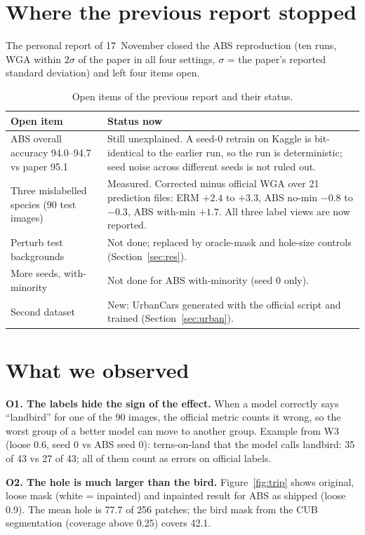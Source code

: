 \documentclass[runningheads]{llncs}
\begin{document}
\section{Where the previous report stopped}

The personal report of 17~November closed the ABS reproduction (ten runs, WGA within $2\sigma$ of the paper in all four settings, $\sigma$ = the paper's reported standard deviation) and left four items open.

\begin{table}[H]
\centering
\caption{Open items of the previous report and their status.}
\label{tab:open}
\small
\begin{tabular}{@{}p{3.6cm}p{8.4cm}@{}}
\toprule
Open item & Status now\\
\midrule
ABS overall accuracy 94.0--94.7 vs paper 95.1 & Still unexplained. A seed-0 retrain on Kaggle is bit-identical to the earlier run, so the run is deterministic; seed noise across different seeds is not ruled out.\\
Three mislabelled species (90 test images) & Measured. Corrected minus official WGA over 21 prediction files: ERM $+2.4$ to $+3.3$, ABS no-min $-0.8$ to $-0.3$, ABS with-min $+1.7$. All three label views are now reported.\\
Perturb test backgrounds & Not done; replaced by oracle-mask and hole-size controls (Section~\ref{sec:res}).\\
More seeds, with-minority & Not done for ABS with-minority (seed 0 only).\\
Second dataset & New: UrbanCars generated with the official script and trained (Section~\ref{sec:urban}).\\
\bottomrule
\end{tabular}
\end{table}

\section{What we observed}

\textbf{O1. The labels hide the sign of the effect.}
When a model correctly says ``landbird'' for one of the 90 images, the official metric counts it wrong, so the worst group of a better model can move to another group. Example from W3 (loose 0.6, seed 0 vs ABS seed 0): terns-on-land that the model calls landbird: 35 of 43 vs 27 of 43; all of them count as errors on official labels.

\textbf{O2. The hole is much larger than the bird.}
Figure~\ref{fig:trip} shows original, loose mask (white = inpainted) and inpainted result for ABS as shipped (loose 0.9). The mean hole is 77.7 of 256 patches; the bird mask from the CUB segmentation (coverage above 0.25) covers 42.1.
\end{document}
